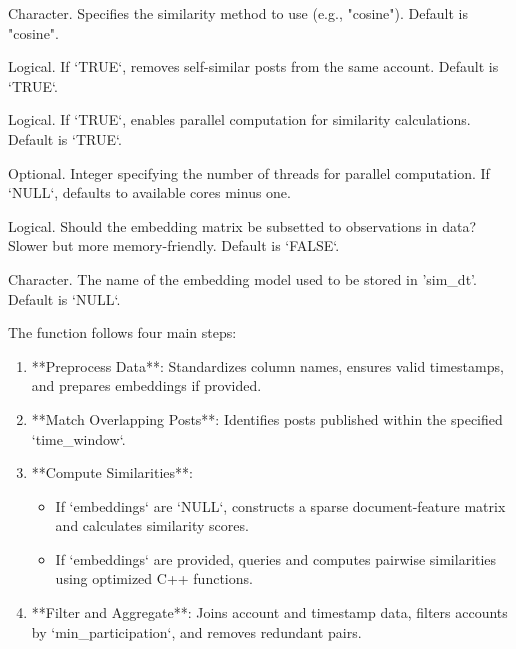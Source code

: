 \documentclass[a4paper]{book}
\begin{document}
\begin{Arguments}
\begin{ldescription}
\item[\code{method}] Character. Specifies the similarity method to use (e.g., "cosine"). Default is "cosine".

\item[\code{remove\_loops}] Logical. If `TRUE`, removes self-similar posts from the same account. Default is `TRUE`.

\item[\code{parallel}] Logical. If `TRUE`, enables parallel computation for similarity calculations. Default is `TRUE`.

\item[\code{n\_threads}] Optional. Integer specifying the number of threads for parallel computation. If `NULL`, defaults to available cores minus one.

\item[\code{subset\_emb}] Logical. Should the embedding matrix be subsetted to observations in data? Slower but more memory-friendly. Default is `FALSE`.

\item[\code{embeddings\_name}] Character. The name of the embedding model used to be stored in 'sim\_dt'. Default is `NULL`.
\end{ldescription}
\end{Arguments}
%
\begin{Details}
The function follows four main steps:
\begin{enumerate}

\item{} **Preprocess Data**: Standardizes column names, ensures valid timestamps, and prepares embeddings if provided.
\item{} **Match Overlapping Posts**: Identifies posts published within the specified `time\_window`.
\item{} **Compute Similarities**: 
\begin{itemize}

\item{} If `embeddings` are `NULL`, constructs a sparse document-feature matrix and calculates similarity scores.
\item{} If `embeddings` are provided, queries and computes pairwise similarities using optimized C++ functions.

\end{itemize}

\item{} **Filter and Aggregate**: Joins account and timestamp data, filters accounts by `min\_participation`, and removes redundant pairs.

\end{enumerate}

\end{Details}
\end{document}
